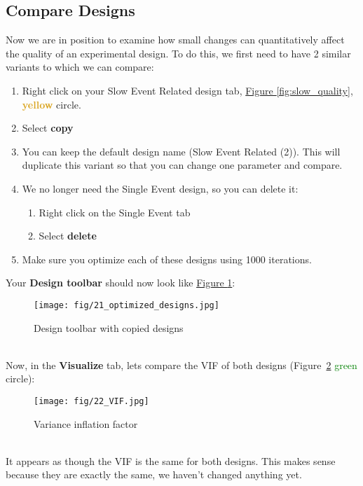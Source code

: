 \documentclass[10pt]{article}
\begin{document}
	\subsection{Compare Designs}
	\label{subsec:u5compare}
		Now we are in position to examine how small changes can quantitatively affect the quality of an experimental design.
		To do this, we first need to have 2 similar variants to which we can compare:
		\begin{enumerate}
			\item Right click on your Slow Event Related design tab, \hyperref[fig:slow_quality]{Figure \ref{fig:slow_quality}}, \textcolor{Goldenrod}{\textbf{yellow}} circle.
			\item Select \textbf{copy}
			\item You can keep the default design name (Slow Event Related (2)).
			This will duplicate this variant so that you can change one parameter and compare.
			\item We no longer need the Single Event design, so you can delete it:
			\begin{enumerate}
				\item Right click on the Single Event tab
				\item Select \textbf{delete}
			\end{enumerate}
			\item Make sure you optimize each of these designs using 1000 iterations.
		\end{enumerate}
		Your \textbf{Design toolbar} should now look like \hyperref[fig:two_designs]{Figure \ref{fig:two_designs}}: \\
		\begin{figure}[ht]
			\centering
			\texttt{[image: fig/21\_optimized\_designs.jpg]}
			\caption{Design toolbar with copied designs}
			\label{fig:two_designs}
		\end{figure} \\
		Now, in the \textbf{Visualize} tab, lets compare the VIF of both designs (Figure~\ref{fig:VIF} \textcolor{green}{green} circle):
		\begin{figure}[ht]
			\centering
			\texttt{[image: fig/22\_VIF.jpg]}
			\caption{Variance inflation factor}
			\label{fig:VIF}
		\end{figure} \\
		It appears as though the VIF is the same for both designs.
		This makes sense because they are exactly the same, we haven't changed anything yet.
		\newpage
\end{document}
